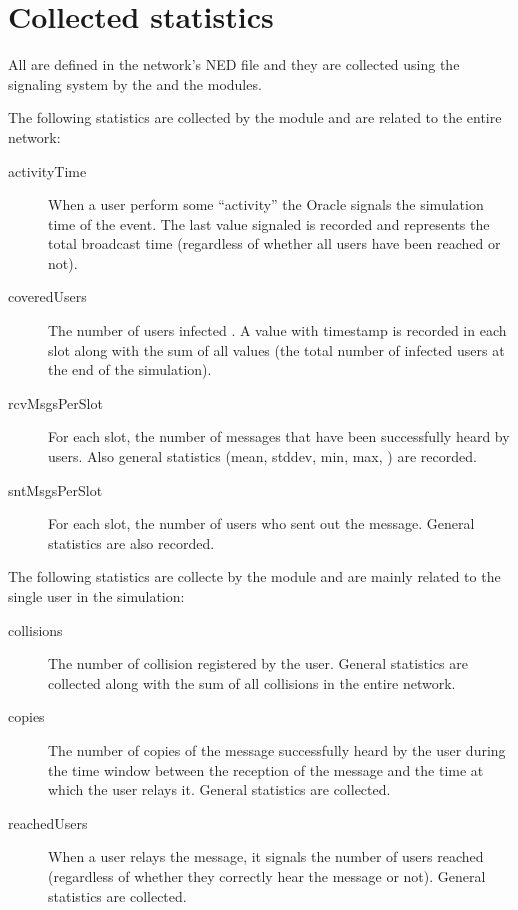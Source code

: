 \section{Collected statistics}\label{sec:statistics}

All  are defined in the  network's NED file and
they are collected using the \omnetpp{} signaling system by the 
and the  modules.

The following statistics are collected by the  module and are
related to the entire  network:
\begin{description}
	\item[activityTime] When a user perform some ``activity''  the Oracle signals
		the simulation time of the event. The last value signaled is
		recorded and represents the total broadcast time (regardless of
		whether all users have been reached or not).
	\item[coveredUsers] The number of users infected . A value with timestamp is
		recorded in each slot along with the sum of all values (the
		total number of infected users at the end of the simulation).
	\item[rcvMsgsPerSlot] For each slot, the number of messages that have
		been successfully heard by users. Also general statistics (mean,
		stddev, min, max, \etc) are recorded.
	\item[sntMsgsPerSlot] For each slot, the number of users who sent out
		the message. General statistics are also recorded.
\end{description}

The following statistics are collecte by the  module and are mainly
related to the single user in the simulation:
\begin{description}
	\item[collisions] The number of collision registered by the user.
		General statistics are collected along with the sum of all
		collisions in the entire network.
	\item[copies] The number of copies of the message successfully heard by
		the user during the time window between the reception of the
		message and the time at which the user relays it. General
		statistics are collected.
	\item[reachedUsers] When a user relays the message, it signals the
		number of users reached (regardless of whether they correctly
		hear the message or not). General statistics are collected.
\end{description}
